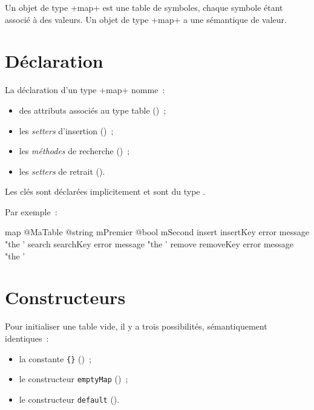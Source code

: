 



Un objet de type \ggs+map+ est une table de symboles, chaque symbole étant associé à des valeurs. Un objet de type \ggs+map+ a une sémantique de valeur.

\section{Déclaration}

La déclaration d'un type \ggs+map+ nomme~:
\begin{itemize}
  \item des attributs associés au type table ()~;
  \item les \emph{setters} d'insertion ()~;
  \item les \emph{méthodes} de recherche ()~;
  \item les \emph{setters} de retrait ().
\end{itemize}

Les clés sont déclarées implicitement et sont du type .

Par exemple~:

\begin{galgas}
map @MaTable {
  @string mPremier
  @bool mSecond
  insert insertKey error message "the '%
  search searchKey error message "the '%
  remove removeKey error message "the '%
}
\end{galgas}







\section{Constructeurs}

Pour initialiser une table vide, il y a trois possibilités, sémantiquement identiques~:
\begin{itemize}
  \item la constante \texttt{\{\}} ()~; 
  \item le constructeur \texttt{emptyMap} ()~; 
  \item le constructeur \texttt{default} (). 
\end{itemize}


